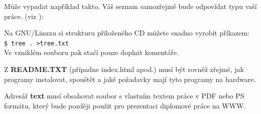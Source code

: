 \documentclass[11pt,twoside,a4paper]{book}
\begin{document}
Může vypadat například takto. Váš seznam samozřejmě bude odpovídat typu vaší práce. (viz \cite{infodp}):

Na GNU/Linuxu si strukturu přiloženého CD můžete snadno vyrobit příkazem:\\ 
\verb|$ tree . >tree.txt|\\
Ve vzniklém souboru pak stačí pouze doplnit komentáře.

Z \textbf{README.TXT} (případne index.html apod.)  musí být rovněž zřejmé, jak programy instalovat, spouštět a jaké požadavky mají tyto programy na hardware.

Adresář \textbf{text}  musí obsahovat soubor s vlastním textem práce v PDF nebo PS formátu, který bude později použit pro prezentaci diplomové práce na WWW.
\end{document}
